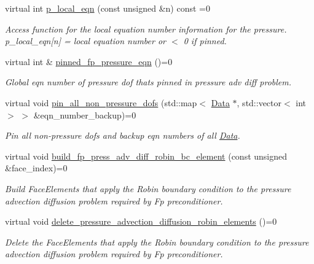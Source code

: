 \begin{DoxyCompactItemize}
virtual int \hyperlink{classoomph_1_1TemplateFreeNavierStokesEquationsBase_a4e84f2f4260a0e65201cbb19fd63b398}{p\+\_\+local\+\_\+eqn} (const unsigned \&n) const =0
\begin{DoxyCompactList}\small\item\em Access function for the local equation number information for the pressure. p\+\_\+local\+\_\+eqn\mbox{[}n\mbox{]} = local equation number or $<$ 0 if pinned. \end{DoxyCompactList}\item 
virtual int \& \hyperlink{classoomph_1_1TemplateFreeNavierStokesEquationsBase_a7b4c21107580d63e358ae7469f04399c}{pinned\+\_\+fp\+\_\+pressure\+\_\+eqn} ()=0
\begin{DoxyCompactList}\small\item\em Global eqn number of pressure dof that\textquotesingle{}s pinned in pressure adv diff problem. \end{DoxyCompactList}\item 
virtual void \hyperlink{classoomph_1_1TemplateFreeNavierStokesEquationsBase_a4db23eff5a82f7b8478c7f9d21857d0a}{pin\+\_\+all\+\_\+non\+\_\+pressure\+\_\+dofs} (std\+::map$<$ \hyperlink{classoomph_1_1Data}{Data} $\ast$, std\+::vector$<$ int $>$ $>$ \&eqn\+\_\+number\+\_\+backup)=0
\begin{DoxyCompactList}\small\item\em Pin all non-\/pressure dofs and backup eqn numbers of all \hyperlink{classoomph_1_1Data}{Data}. \end{DoxyCompactList}\item 
virtual void \hyperlink{classoomph_1_1TemplateFreeNavierStokesEquationsBase_a8e896ce593f2dad7d21fade4afabe2c4}{build\+\_\+fp\+\_\+press\+\_\+adv\+\_\+diff\+\_\+robin\+\_\+bc\+\_\+element} (const unsigned \&face\+\_\+index)=0
\begin{DoxyCompactList}\small\item\em Build Face\+Elements that apply the Robin boundary condition to the pressure advection diffusion problem required by Fp preconditioner. \end{DoxyCompactList}\item 
virtual void \hyperlink{classoomph_1_1TemplateFreeNavierStokesEquationsBase_ac0505918d7458688c9cf55d348c92120}{delete\+\_\+pressure\+\_\+advection\+\_\+diffusion\+\_\+robin\+\_\+elements} ()=0
\begin{DoxyCompactList}\small\item\em Delete the Face\+Elements that apply the Robin boundary condition to the pressure advection diffusion problem required by Fp preconditioner. \end{DoxyCompactList}\item 

\end{DoxyCompactItemize}
